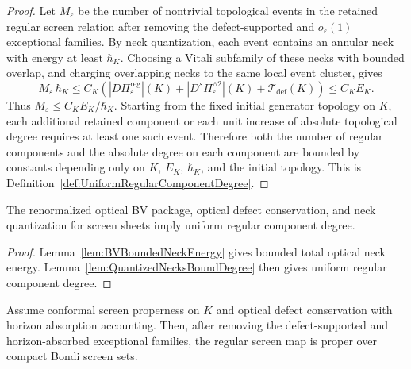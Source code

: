\begin{proof}
Let $M_\varepsilon$ be the number of nontrivial topological events in the retained regular screen relation after removing the defect-supported and $o_\varepsilon(1)$ exceptional families. By neck quantization, each event contains an annular neck with energy at least $\hbar_K$. Choosing a Vitali subfamily of these necks with bounded overlap, and charging overlapping necks to the same local event cluster, gives
\[
    M_\varepsilon\,\hbar_K
    \le
    C_K
    \left(
        |D\Pi_\varepsilon^{\mathrm{reg}}|(K)
        +
        |D^s\Pi_\varepsilon^{\wedge 2}|(K)
        +
        \mathcal T_{\mathrm{def}}(K)
    \right)
    \le C_K E_K .
\]
Thus $M_\varepsilon\le C_KE_K/\hbar_K$. Starting from the fixed initial generator topology on $K$, each additional retained component or each unit increase of absolute topological degree requires at least one such event. Therefore both the number of regular components and the absolute degree on each component are bounded by constants depending only on $K$, $E_K$, $\hbar_K$, and the initial topology. This is Definition~\ref{def:UniformRegularComponentDegree}.
\end{proof}

\begin{theorem}\label{thm:NeckQuantizationUniformDegree}
The renormalized optical BV package, optical defect conservation, and neck quantization for screen sheets imply uniform regular component degree.
\end{theorem}

\begin{proof}
Lemma~\ref{lem:BVBoundedNeckEnergy} gives bounded total optical neck energy. Lemma~\ref{lem:QuantizedNecksBoundDegree} then gives uniform regular component degree.
\end{proof}

\begin{lemma}\label{lem:ConformalPropernessScreenProperness}
Assume conformal screen properness on $K$ and optical defect conservation with horizon absorption accounting. Then, after removing the defect-supported and horizon-absorbed exceptional families, the regular screen map is proper over compact Bondi screen sets.
\end{lemma}

